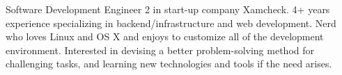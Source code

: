 

\begin{cvparagraph}

Software Development Engineer 2 in start-up company Xamcheck. 4+ years experience specializing in backend/infrastructure and web development. Nerd who loves Linux and OS X and enjoys to customize all of the development environment. Interested in devising a better problem-solving method for challenging tasks, and learning new technologies and tools if the need arises.
\end{cvparagraph}
